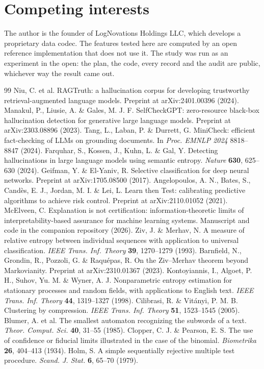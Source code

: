 \documentclass[11pt]{article}
\begin{document}
\section*{Competing interests}
The author is the founder of LogNovations Holdings LLC, which develops a proprietary data codec. The features tested here are computed by an open reference implementation that does not use it. The study was run as an experiment in the open: the plan, the code, every record and the audit are public, whichever way the result came out.

\begin{thebibliography}{99}\small
{} Niu, C. et al. RAGTruth: a hallucination corpus for developing trustworthy retrieval-augmented language models. Preprint at arXiv:2401.00396 (2024).
 Manakul, P., Liusie, A. \& Gales, M. J. F. SelfCheckGPT: zero-resource black-box hallucination detection for generative large language models. Preprint at arXiv:2303.08896 (2023).
 Tang, L., Laban, P. \& Durrett, G. MiniCheck: efficient fact-checking of LLMs on grounding documents. In \emph{Proc. EMNLP 2024} 8818--8847 (2024).
 Farquhar, S., Kossen, J., Kuhn, L. \& Gal, Y. Detecting hallucinations in large language models using semantic entropy. \emph{Nature} \textbf{630}, 625--630 (2024).
 Geifman, Y. \& El-Yaniv, R. Selective classification for deep neural networks. Preprint at arXiv:1705.08500 (2017).
 Angelopoulos, A. N., Bates, S., Cand\`es, E. J., Jordan, M. I. \& Lei, L. Learn then Test: calibrating predictive algorithms to achieve risk control. Preprint at arXiv:2110.01052 (2021).
 McElveen, C. Explanation is not certification: information-theoretic limits of interpretability-based assurance for machine learning systems. Manuscript and code in the companion repository (2026).
 Ziv, J. \& Merhav, N. A measure of relative entropy between individual sequences with application to universal classification. \emph{IEEE Trans. Inf. Theory} \textbf{39}, 1270--1279 (1993).
 Barnfield, N., Grondin, R., Pozzoli, G. \& Raqu\'epas, R. On the Ziv--Merhav theorem beyond Markovianity. Preprint at arXiv:2310.01367 (2023).
 Kontoyiannis, I., Algoet, P. H., Suhov, Yu. M. \& Wyner, A. J. Nonparametric entropy estimation for stationary processes and random fields, with applications to English text. \emph{IEEE Trans. Inf. Theory} \textbf{44}, 1319--1327 (1998).
 Cilibrasi, R. \& Vit\'anyi, P. M. B. Clustering by compression. \emph{IEEE Trans. Inf. Theory} \textbf{51}, 1523--1545 (2005).
 Blumer, A. et al. The smallest automaton recognizing the subwords of a text. \emph{Theor. Comput. Sci.} \textbf{40}, 31--55 (1985).
 Clopper, C. J. \& Pearson, E. S. The use of confidence or fiducial limits illustrated in the case of the binomial. \emph{Biometrika} \textbf{26}, 404--413 (1934).
 Holm, S. A simple sequentially rejective multiple test procedure. \emph{Scand. J. Stat.} \textbf{6}, 65--70 (1979).
\end{thebibliography}
\end{document}
